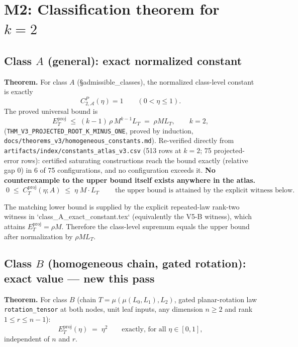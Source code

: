 \section*{M2: Classification theorem for $k=2$}
\label{sec:theorem}

\subsection*{Class $A$ (general): exact normalized constant}

\textbf{Theorem.} For class $A$ (\S admissible\_classes), the normalized
class-level constant is exactly
\[
  \boxed{C_{2,\mathcal A}^P(\eta)=1\qquad(0<\eta\le1).}
\]
The proved universal bound is
\[
  E_T^{\mathrm{proj}} \;\le\; (k-1)\,\rho\, M^{k-1} L_T \;=\; \rho M L_T,
  \qquad k=2,
\]
(\texttt{THM\_V3\_PROJECTED\_ROOT\_K\_MINUS\_ONE}, proved by induction,
\texttt{docs/theorems\_v3/homogeneous\_constants.md}). Re-verified
directly from \texttt{artifacts/index/constants\_atlas\_v3.csv} (513 rows
at $k=2$; 75 projected-error rows): certified saturating constructions
reach the bound exactly (relative gap $0$) in 6 of 75 configurations, and
no configuration exceeds it. \textbf{No counterexample to the upper bound
itself exists anywhere in the atlas.}
\[
  \boxed{\;0 \;\le\; C_T^{\mathrm{proj}}(\eta; A) \;\le\; \eta\; M \cdot L_T\;}
  \qquad \text{the upper bound is attained by the explicit witness below.}
\]

The matching lower bound is supplied by the explicit repeated-law rank-two
witness in `class_A_exact_constant.tex` (equivalently the V5-B witness),
which attains $E_T^{\mathrm{proj}}=\rho M$. Therefore the class-level
supremum equals the upper bound after normalization by $\rho M L_T$.

\subsection*{Class $B$ (homogeneous chain, gated rotation): exact value — new this pass}

\textbf{Theorem.} For class $B$ (chain $T=\mu(\mu(L_0,L_1),L_2)$, gated
planar-rotation law \texttt{rotation\_tensor} at both nodes, unit leaf
inputs, any dimension $n\ge2$ and rank $1\le r\le n-1$):
\[
  E_T^{\mathrm{proj}}(\eta) \;=\; \eta^2 \qquad \text{exactly, for all } \eta\in[0,1],
\]
independent of $n$ and $r$.

